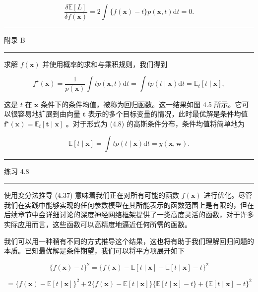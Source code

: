 \documentclass[10pt]{report}
\newcommand{\HRule}{\begin{center}\rule{0.9\linewidth}{0.2mm}\end{center}}
\begin{document}
\[
\frac{\delta \mathbb{E}\left\lbrack  L\right\rbrack  }{{\delta f}\left( \mathbf{x}\right) } = 2\int \{ f\left( \mathbf{x}\right)  - t\} p\left( {\mathbf{x},t}\right) \mathrm{d}t = 0. \tag{4.36}
\]

\HRule

附录 B

\HRule

求解 \(f\left( \mathbf{x}\right)\) 并使用概率的求和与乘积规则，我们得到

\[
{f}^{ \star  }\left( \mathbf{x}\right)  = \frac{1}{p\left( \mathbf{x}\right) }\int {tp}\left( {\mathbf{x},t}\right) \mathrm{d}t = \int {tp}\left( {t \mid  \mathbf{x}}\right) \mathrm{d}t = {\mathbb{E}}_{t}\left\lbrack  {t \mid  \mathbf{x}}\right\rbrack  , \tag{4.37}
\]

这是 \(t\) 在 \(\mathbf{x}\) 条件下的条件均值，被称为回归函数。这一结果如图 4.5 所示。它可以很容易地扩展到由向量 \(\mathbf{t}\) 表示的多个目标变量的情况，此时最优解是条件均值 \({\mathbf{f}}^{ \star  }\left( \mathbf{x}\right)  = {\mathbb{E}}_{t}\left\lbrack  {\mathbf{t} \mid  \mathbf{x}}\right\rbrack\) 。对于形式为 (4.8) 的高斯条件分布，条件均值将简单地为

\[
\mathbb{E}\left\lbrack  {t \mid  \mathbf{x}}\right\rbrack   = \int {tp}\left( {t \mid  \mathbf{x}}\right) \mathrm{d}t = y\left( {\mathbf{x},\mathbf{w}}\right) . \tag{4.38}
\]

\HRule

练习 4.8

\HRule

使用变分法推导 (4.37) 意味着我们正在对所有可能的函数 \(f\left( \mathbf{x}\right)\) 进行优化。尽管我们在实践中能够实现的任何参数模型在其所能表示的函数范围上是有限的，但在后续章节中会详细讨论的深度神经网络框架提供了一类高度灵活的函数，对于许多实际应用而言，这些函数可以高精度地逼近任何所需的函数。

我们可以用一种稍有不同的方式推导这个结果，这也将有助于我们理解回归问题的本质。已知最优解是条件期望，我们可以将平方项展开如下

\[
\{ f\left( \mathbf{x}\right)  - t{\} }^{2} = \{ f\left( \mathbf{x}\right)  - \mathbb{E}\left\lbrack  {t \mid  \mathbf{x}}\right\rbrack   + \mathbb{E}\left\lbrack  {t \mid  \mathbf{x}}\right\rbrack   - t{\} }^{2}
\]

\[
= \{ f\left( \mathbf{x}\right)  - \mathbb{E}\left\lbrack  {t \mid  \mathbf{x}}\right\rbrack  {\} }^{2} + 2\{ f\left( \mathbf{x}\right)  - \mathbb{E}\left\lbrack  {t \mid  \mathbf{x}}\right\rbrack  \} \{ \mathbb{E}\left\lbrack  {t \mid  \mathbf{x}}\right\rbrack   - t\}  + \{ \mathbb{E}\left\lbrack  {t \mid  \mathbf{x}}\right\rbrack   - t{\} }^{2}
\]
\end{document}

